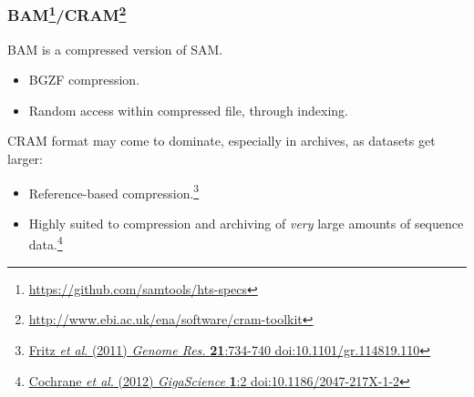 \begin{frame}[fragile]
  \frametitle{BAM\footnote{\tiny{\href{http://samtools.github.io/hts-specs/SAMv1.pdf}{https://github.com/samtools/hts-specs}}}/CRAM\footnote{\tiny{\href{http://www.ebi.ac.uk/ena/software/cram-toolkit}{http://www.ebi.ac.uk/ena/software/cram-toolkit}}}}
  BAM is a compressed version of SAM.\\
  \begin{itemize}
    \item BGZF compression.
    \item Random access within compressed file, through indexing.
  \end{itemize}
  CRAM format may come to dominate, especially in archives, as datasets get larger:
  \begin{itemize}
    \item Reference-based compression.\footnote{\tiny{\href{http://dx.doi.org/10.1101/gr.114819.110}{Fritz \textit{et al}. (2011) \textit{Genome Res.} \textbf{21}:734-740 doi:10.1101/gr.114819.110}}}
    \item Highly suited to compression and archiving of \textit{very} large amounts of sequence data.\footnote{\tiny{\href{http://dx.doi.org/10.1186/2047-217X-1-2}{Cochrane \textit{et al}. (2012) \textit{GigaScience} \textbf{1}:2 doi:10.1186/2047-217X-1-2}}}
  \end{itemize}  
\end{frame}

